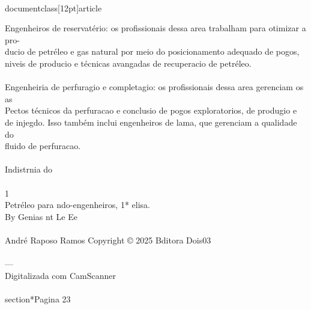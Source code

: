 \\documentclass[12pt]{article}
\begin{document}
{Engenheiros de reservatério: os profissionais dessa area trabalham para otimizar a pro-\\
ducio de petréleo e gas natural por meio do posicionamento adequado de pogos,\\
niveis de producio e técnicas avangadas de recuperacio de petréleo.\\
\\
Engenheiria de perfuragio e completagio: os profissionais dessa area gerenciam os as\\
Pectos técnicos da perfuracao e conclusio de pogos exploratorios, de produgio e\\
de injegdo. Isso também inclui engenheiros de lama, que gerenciam a qualidade do\\
fluido de perfuracao.\\
\\
Indistrnia do\\
\\
1\\
Petréleo para ndo-engenheiros, 1* elisa.\\
By Genias nt Le Ee\\
\\
André Raposo Ramos Copyright © 2025 Bditora Dois03\\
\\
—\\
Digitalizada com CamScanner\\

\\section*{Pagina 23}

}
\end{document}
